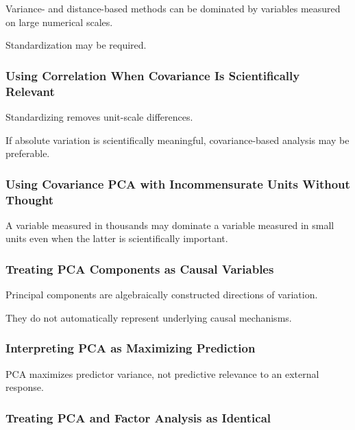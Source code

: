 Variance- and distance-based methods can be dominated by variables
measured on large numerical scales.

Standardization may be required.

\subsubsection{Using Correlation When Covariance Is Scientifically Relevant}

Standardizing removes unit-scale differences.

If absolute variation is scientifically meaningful, covariance-based
analysis may be preferable.

\subsubsection{Using Covariance PCA with Incommensurate Units Without Thought}

A variable measured in thousands may dominate a variable measured in
small units even when the latter is scientifically important.

\subsubsection{Treating PCA Components as Causal Variables}

Principal components are algebraically constructed directions of
variation.

They do not automatically represent underlying causal mechanisms.

\subsubsection{Interpreting PCA as Maximizing Prediction}

PCA maximizes predictor variance, not predictive relevance to an external
response.

\subsubsection{Treating PCA and Factor Analysis as Identical}

